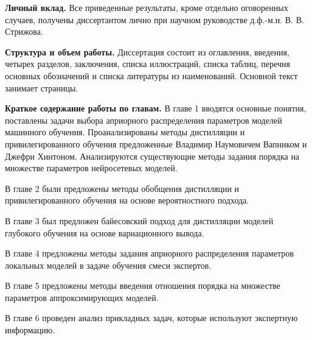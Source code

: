 \vspace{0.5cm}
\textbf{Личный вклад.} Все приведенные результаты, кроме отдельно оговоренных случаев, получены диссертантом лично при научном руководстве д.ф.-м.н. В. В. Стрижова.

\vspace{0.5cm}
\textbf{Структура и объем работы.} Диссертация состоит из оглавления, введения, четырех разделов, заключения, списка иллюстраций, списка таблиц, перечня основных обозначений и списка литературы из  наименований. Основной текст занимает \pageref{LastPage} страницы.

\vspace{0.5cm}
\textbf{Краткое содержание работы по главам.}
В главе 1 вводятся основные понятия, поставлены задачи выбора априорного распределения параметров моделей машинного обучения. Проанализированы методы дистилляции и привилегированного обучения предложенные Владимир Наумовичем Вапником и Джефри Хинтоном. Анализируются существующие методы задания порядка на множестве параметров нейросетевых моделей.
 
В главе 2 были предложены методы обобщения дистилляции и привилегированного обучения на основе вероятностного подхода.

В главе 3 был предложен байесовский подход для дистилляции моделей глубокого обучения на основе вариационного вывода.

В главе 4 предложены методы задания априорного распределения параметров локальных моделей в задаче обучения смеси экспертов.

В главе 5 предложены методы введения отношения порядка на множестве параметров аппроксимирующих моделей.

В главе 6 проведен анализ прикладных задач, которые используют экспертную информацию.




